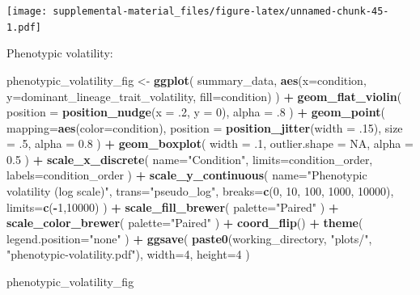 \documentclass[]{book}
\newenvironment{Shaded}{\begin{snugshade}}{\end{snugshade}}
\newcommand{\DataTypeTok}[1]{\textcolor[rgb]{0.13,0.29,0.53}{#1}}
\newcommand{\DecValTok}[1]{\textcolor[rgb]{0.00,0.00,0.81}{#1}}
\newcommand{\FloatTok}[1]{\textcolor[rgb]{0.00,0.00,0.81}{#1}}
\newcommand{\KeywordTok}[1]{\textcolor[rgb]{0.13,0.29,0.53}{\textbf{#1}}}
\newcommand{\NormalTok}[1]{#1}
\newcommand{\OperatorTok}[1]{\textcolor[rgb]{0.81,0.36,0.00}{\textbf{#1}}}
\newcommand{\OtherTok}[1]{\textcolor[rgb]{0.56,0.35,0.01}{#1}}
\newcommand{\StringTok}[1]{\textcolor[rgb]{0.31,0.60,0.02}{#1}}
\begin{document}
\texttt{[image: supplemental-material\_files/figure-latex/unnamed-chunk-45-1.pdf]}

Phenotypic volatility:

\begin{Shaded}
\begin{Highlighting}[]
\NormalTok{phenotypic_volatility_fig <-}\StringTok{ }\KeywordTok{ggplot}\NormalTok{(}
\NormalTok{    summary_data,}
    \KeywordTok{aes}\NormalTok{(}\DataTypeTok{x=}\NormalTok{condition, }\DataTypeTok{y=}\NormalTok{dominant_lineage_trait_volatility, }\DataTypeTok{fill=}\NormalTok{condition)}
\NormalTok{  ) }\OperatorTok{+}
\StringTok{  }\KeywordTok{geom_flat_violin}\NormalTok{(}
    \DataTypeTok{position =} \KeywordTok{position_nudge}\NormalTok{(}\DataTypeTok{x =} \FloatTok{.2}\NormalTok{, }\DataTypeTok{y =} \DecValTok{0}\NormalTok{),}
    \DataTypeTok{alpha =} \FloatTok{.8}
\NormalTok{  ) }\OperatorTok{+}
\StringTok{  }\KeywordTok{geom_point}\NormalTok{(}
    \DataTypeTok{mapping=}\KeywordTok{aes}\NormalTok{(}\DataTypeTok{color=}\NormalTok{condition),}
    \DataTypeTok{position =} \KeywordTok{position_jitter}\NormalTok{(}\DataTypeTok{width =} \FloatTok{.15}\NormalTok{),}
    \DataTypeTok{size =} \FloatTok{.5}\NormalTok{,}
    \DataTypeTok{alpha =} \FloatTok{0.8}
\NormalTok{  ) }\OperatorTok{+}
\StringTok{  }\KeywordTok{geom_boxplot}\NormalTok{(}
    \DataTypeTok{width =} \FloatTok{.1}\NormalTok{,}
    \DataTypeTok{outlier.shape =} \OtherTok{NA}\NormalTok{,}
    \DataTypeTok{alpha =} \FloatTok{0.5}
\NormalTok{  ) }\OperatorTok{+}
\StringTok{  }\KeywordTok{scale_x_discrete}\NormalTok{(}
    \DataTypeTok{name=}\StringTok{"Condition"}\NormalTok{,}
    \DataTypeTok{limits=}\NormalTok{condition_order,}
    \DataTypeTok{labels=}\NormalTok{condition_order}
\NormalTok{  ) }\OperatorTok{+}
\StringTok{  }\KeywordTok{scale_y_continuous}\NormalTok{(}
    \DataTypeTok{name=}\StringTok{"Phenotypic volatility (log scale)"}\NormalTok{,}
    \DataTypeTok{trans=}\StringTok{"pseudo_log"}\NormalTok{,}
    \DataTypeTok{breaks=}\KeywordTok{c}\NormalTok{(}\DecValTok{0}\NormalTok{, }\DecValTok{10}\NormalTok{, }\DecValTok{100}\NormalTok{, }\DecValTok{1000}\NormalTok{, }\DecValTok{10000}\NormalTok{),}
    \DataTypeTok{limits=}\KeywordTok{c}\NormalTok{(}\OperatorTok{-}\DecValTok{1}\NormalTok{,}\DecValTok{10000}\NormalTok{)}
\NormalTok{  ) }\OperatorTok{+}
\StringTok{  }\KeywordTok{scale_fill_brewer}\NormalTok{(}
    \DataTypeTok{palette=}\StringTok{"Paired"}
\NormalTok{  ) }\OperatorTok{+}
\StringTok{  }\KeywordTok{scale_color_brewer}\NormalTok{(}
    \DataTypeTok{palette=}\StringTok{"Paired"}
\NormalTok{  ) }\OperatorTok{+}
\StringTok{  }\KeywordTok{coord_flip}\NormalTok{() }\OperatorTok{+}
\StringTok{  }\KeywordTok{theme}\NormalTok{(}
    \DataTypeTok{legend.position=}\StringTok{"none"}
\NormalTok{  ) }\OperatorTok{+}
\StringTok{  }\KeywordTok{ggsave}\NormalTok{(}
    \KeywordTok{paste0}\NormalTok{(working_directory, }\StringTok{"plots/"}\NormalTok{, }\StringTok{"phenotypic-volatility.pdf"}\NormalTok{),}
    \DataTypeTok{width=}\DecValTok{4}\NormalTok{,}
    \DataTypeTok{height=}\DecValTok{4}
\NormalTok{  )}

\NormalTok{phenotypic_volatility_fig}
\end{Highlighting}
\end{Shaded}
\end{document}
